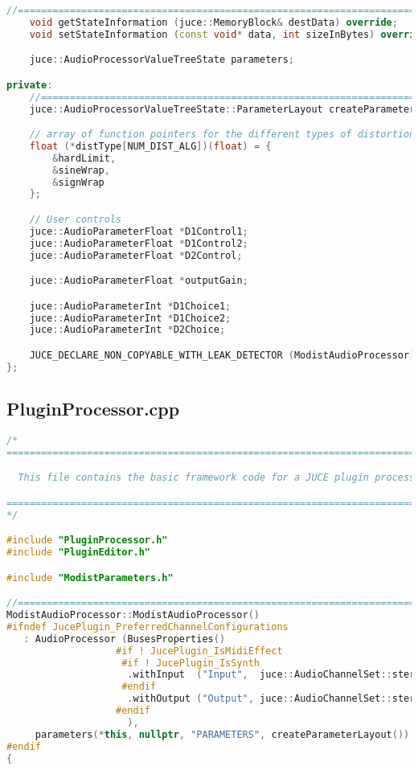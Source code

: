 \documentclass{article}
\begin{document}
\begin{appendix}
\begin{lstlisting}[language=C++]
    //==============================================================================
    void getStateInformation (juce::MemoryBlock& destData) override;
    void setStateInformation (const void* data, int sizeInBytes) override;

    juce::AudioProcessorValueTreeState parameters;

private:
    //==============================================================================
    juce::AudioProcessorValueTreeState::ParameterLayout createParameterLayout();

    // array of function pointers for the different types of distortion algorithms
    float (*distType[NUM_DIST_ALG])(float) = {
        &hardLimit,
        &sineWrap,
        &signWrap
    };

    // User controls
    juce::AudioParameterFloat *D1Control1;
    juce::AudioParameterFloat *D1Control2;
    juce::AudioParameterFloat *D2Control;

    juce::AudioParameterFloat *outputGain;

    juce::AudioParameterInt *D1Choice1;
    juce::AudioParameterInt *D1Choice2;
    juce::AudioParameterInt *D2Choice;

    JUCE_DECLARE_NON_COPYABLE_WITH_LEAK_DETECTOR (ModistAudioProcessor)
};

\end{lstlisting}

\pagebreak

\subsection{PluginProcessor.cpp}
\begin{lstlisting}[language=C++]
/*
==============================================================================

  This file contains the basic framework code for a JUCE plugin processor.

==============================================================================
*/

#include "PluginProcessor.h"
#include "PluginEditor.h"

#include "ModistParameters.h"

//==============================================================================
ModistAudioProcessor::ModistAudioProcessor()
#ifndef JucePlugin_PreferredChannelConfigurations
   : AudioProcessor (BusesProperties()
                   #if ! JucePlugin_IsMidiEffect
                    #if ! JucePlugin_IsSynth
                     .withInput  ("Input",  juce::AudioChannelSet::stereo(), true)
                    #endif
                     .withOutput ("Output", juce::AudioChannelSet::stereo(), true)
                   #endif
                     ),
     parameters(*this, nullptr, "PARAMETERS", createParameterLayout())
#endif
{


\end{lstlisting}
\end{appendix}
\end{document}
